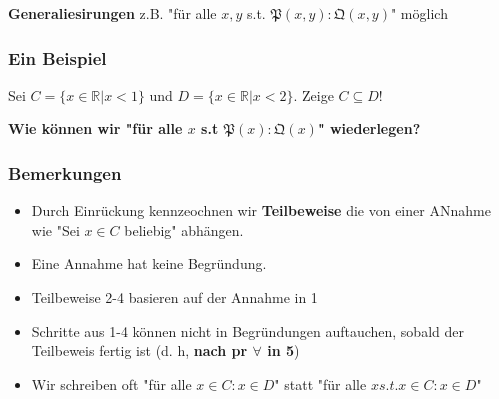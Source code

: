 \textbf{Generaliesirungen} z.B. "für alle $x, y$ s.t. $\mathfrak{P}(x,y):\mathfrak{Q}(x,y)$" möglich

\subsubsection{Ein Beispiel} Sei $C = \{x \in \mathbb{R} \vert x < 1\}$ und $D = \{x \in \mathbb{R}\vert x < 2\}$. Zeige $C \subseteq D$! 



\textbf{Wie können wir "für alle $x$ s.t $\mathfrak{P}(x) : \mathfrak{Q}(x)$" wiederlegen?}

\subsubsection{Bemerkungen}
\begin{itemize}
    \item Durch Einrückung kennzeochnen wir \textbf{Teilbeweise} die von einer ANnahme wie "Sei $x \in C$ beliebig" abhängen.
    \item Eine Annahme hat keine Begründung.
    \item Teilbeweise 2-4 basieren auf der Annahme in 1
    \item Schritte aus 1-4 können nicht in Begründungen auftauchen, sobald der Teilbeweis fertig ist (d. h, \textbf{nach pr $\forall$ in 5})
    \item Wir schreiben oft "für alle $x \in C : x \in D$" statt "für alle $x s.t. x \in C : x \in D$" 
\end{itemize}

